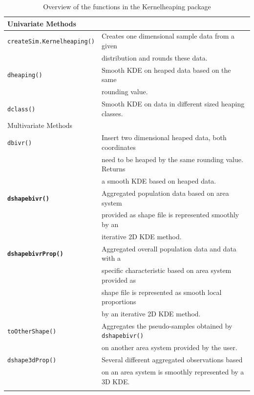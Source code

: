 \begin{longtable}{|l | l|}
    \hline
    Univariate Methods & \\
    \hline
    \hline
    \texttt{createSim.Kernelheaping()}& Creates one dimensional sample data from a given  \\
                                      & distribution and rounds these data. \\
    \hline
    \texttt{dheaping()} & Smooth KDE on heaped data based on the same \\ 
                        & rounding value.\\
    \hline 
    \texttt{dclass()} & Smooth KDE on data in different sized heaping classes. \\  
    \hline
    \hline 
    Multivariate Methods & \\
    \hline 
    \hline
    \texttt{dbivr()} & Insert two dimensional heaped data, both coordinates \\
    & need to be heaped by the same rounding value. Returns  \\
    & a smooth KDE based on heaped data. \\
    \hline
    \textbf{\texttt{dshapebivr()}} & Aggregated population data based on area system \\
    & provided as shape file is represented smoothly by an  \\
    & iterative 2D KDE method. \\
    \hline 
    \textbf{\texttt{dshapebivrProp()}} & Aggregated overall population data and data with a  \\ 
    & specific characteristic based on area system provided as  \\
    & shape file is represented as smooth local proportions \\
    & by an iterative 2D KDE method. \\
    \hline
    \texttt{toOtherShape()} & Aggregates the pseudo-samples obtained by \texttt{dshapebivr()} \\ 
    & on another area system provided by the user. \\   
    \hline
    \texttt{dshape3dProp()} & Several different aggregated observations based \\
    & on an area system is smoothly represented by a 3D KDE. \\
    \hline 
    \caption{Overview of the functions in the Kernelheaping package}\label{tab:my_label}
\end{longtable}


